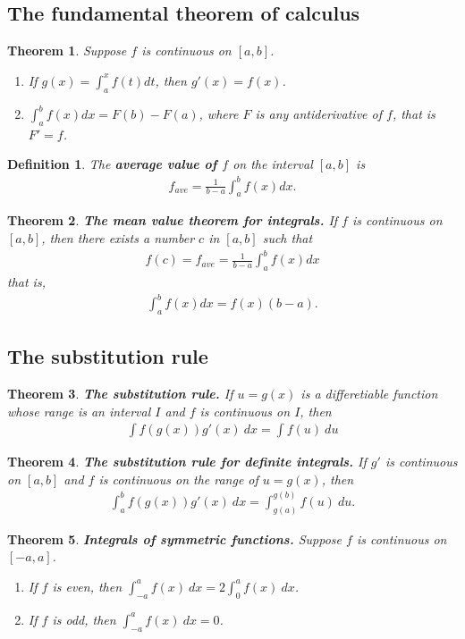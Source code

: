 \documentclass{article}
\theoremstyle{sltheorem}
\newtheorem{definition}{Definition}[section]
\newtheorem{theorem}{Theorem}[section]
\begin{document}
\subsection{The fundamental theorem of calculus}
\begin{theorem}
   Suppose $f$ is continuous on $[a,b]$.
   \begin{enumerate}
       \item If $g(x)=\int_a^x f(t)dt$, then $g'(x)=f(x)$.
       \item $\int_a^b f(x)dx=F(b)-F(a)$, where $F$ is any antiderivative of $f$, that is $F'=f$.
   \end{enumerate}
\end{theorem}
\begin{definition}
    The \textbf{average value of $f$} on the interval $[a,b]$ is
    \begin{align*}
        f_{ave}=\frac{1}{b-a}\int_a^b f(x)dx.
    \end{align*}
\end{definition}
\begin{theorem}
    \textbf{The mean value theorem for integrals.} If $f$ is continuous on $[a,b]$, then there exists a number $c$ in $[a,b]$ such that
    \begin{align*}
        f(c)=f_{ave}=\frac{1}{b-a}\int_a^b f(x)dx
    \end{align*}
    that is,
    \begin{align*}
        \int_a^b f(x)dx=f(x)(b-a).
    \end{align*}
\end{theorem}
\subsection{The substitution rule}
\begin{theorem}
    \textbf{The substitution rule.}
    If $u=g(x)$ is a differetiable function whose range is an interval $I$ and $f$ is continuous on $I$, then
    \begin{align*}
        \int f(g(x))g'(x)\:dx=\int f(u)\:du
    \end{align*}
\end{theorem}
\begin{theorem}
    \textbf{The substitution rule for definite integrals.}
    If $g'$ is continuous on $[a,b]$ and $f$ is continuous on the range of $u=g(x)$, then 
    \begin{align*}
        \int_a^b f(g(x))g'(x)\:dx=\int_{g(a)}^{g(b)}f(u)\:du.
    \end{align*}
\end{theorem}
\begin{theorem}
    \textbf{Integrals of symmetric functions.} Suppose $f$ is continuous on $[-a,a]$.
    \begin{enumerate}
        \item If $f$ is even, then $\int_{-a}^a f(x)\:dx= 2\int_0^a f(x)\:dx$.
        \item If $f$ is odd, then $\int_{-a}^a f(x)\:dx = 0$.
    \end{enumerate}
\end{theorem}
\end{document}
